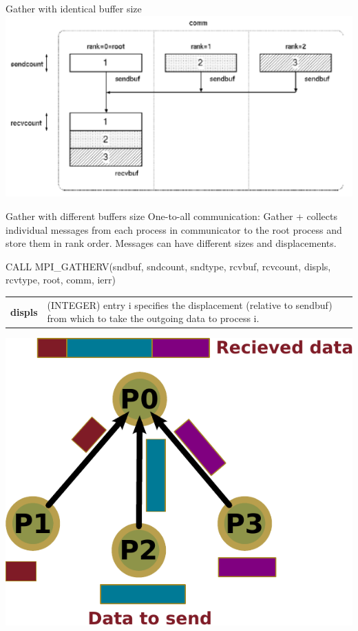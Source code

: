 \documentclass[aspectratio=43]{beamer}
\begin{document}
\begin{frame}{Gather with identical buffer size}
\includegraphics[scale=0.5]{03.MPI_Coll/gather1.pdf}
\end{frame}

\begin{frame}[fragile]{Gather with different buffers size}
One-to-all communication: Gather + collects individual messages from each process in communicator to the root process and store them in rank order. Messages can have different sizes and displacements.\\
\begin{Fortranlisting}[]{}
CALL MPI_GATHERV(sndbuf, sndcount, sndtype,
                 rcvbuf, rcvcount, displs, rcvtype,
                 root, comm, ierr)
\end{Fortranlisting}
\begin{black1block}{}
\begin{tabular}{rp{8cm}}
\textbf{displs} & (INTEGER) entry i specifies the displacement (relative to sendbuf) from which to take the outgoing data to process i.\\
\end{tabular}
\end{black1block}
\begin{center}
\includegraphics[scale=0.33]{03.MPI_Coll/gatherv.pdf}
\end{center}
\end{frame}
\end{document}
